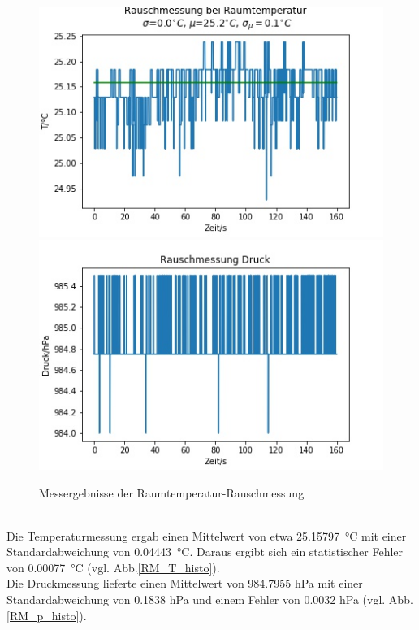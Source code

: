 \documentclass[]{article}
\begin{document}
\begin{figure}[h]
	\begin{center}
		\includegraphics[scale=0.45]{Images/RauschmessungRT_T.jpg}
		\includegraphics[scale=0.45]{Images/RauschmessungRT_p.jpg}
		\caption{Messergebnisse der Raumtemperatur-Rauschmessung}
		\label{RM_T_p}
	\end{center}
\end{figure}\\
Die Temperaturmessung ergab einen Mittelwert von etwa \SI{25.15797}{\celsius} mit einer Standardabweichung von \SI{0.04443}{\celsius}.  Daraus ergibt sich ein statistischer Fehler von \SI{0.00077}{\celsius} (vgl. Abb.\ref{RM_T_histo}).\\
Die Druckmessung lieferte einen Mittelwert von 984.7955 hPa mit einer Standardabweichung von 0.1838 hPa und einem Fehler von 0.0032 hPa (vgl. Abb.\ref{RM_p_histo}).
\end{document}
